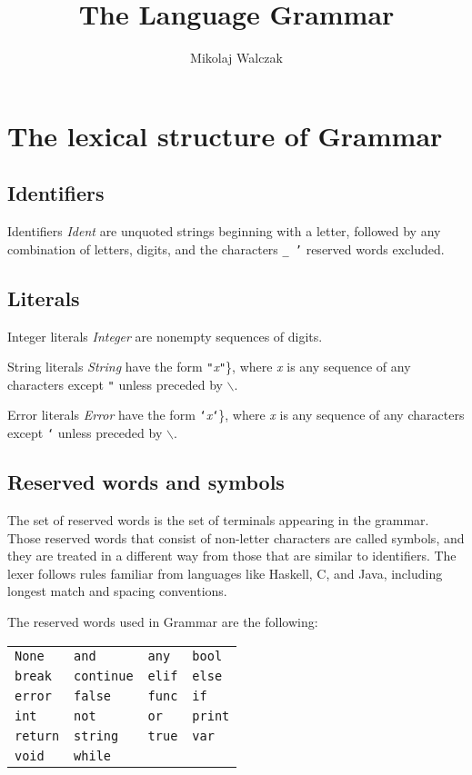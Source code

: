 \documentclass{article}
\title{The Language Grammar}
\author{Mikolaj Walczak}
\begin{document}
\maketitle
\clearpage

\section{The lexical structure of Grammar}

\subsection{Identifiers}

Identifiers \textit{Ident} are unquoted strings beginning with a letter,
followed by any combination of letters, digits, and the characters \texttt{\_ '}
reserved words excluded.

\subsection{Literals}

Integer literals \textit{Integer} are nonempty sequences of digits.

String literals \textit{String} have the form
\texttt{"}\textit{x}\texttt{"}\}, where \textit{x} is any sequence of any characters
except \texttt{"} unless preceded by \texttt{$\backslash$}.

Error literals \textit{Error} have the form
\texttt{`}\textit{x}\texttt{`}\}, where \textit{x} is any sequence of any characters
except \texttt{`} unless preceded by \texttt{$\backslash$}.

\subsection{Reserved words and symbols}

The set of reserved words is the set of terminals appearing in the grammar.
Those reserved words that consist of non-letter characters are called symbols,
and they are treated in a different way from those that are similar to
identifiers. The lexer follows rules familiar from languages like Haskell,
C, and Java, including longest match and spacing conventions.

The reserved words used in Grammar are the following:

\begin{center}\begin{tabular}{llll}
\texttt{None} & \texttt{and} & \texttt{any} & \texttt{bool} \\
\texttt{break} & \texttt{continue} & \texttt{elif} & \texttt{else} \\
\texttt{error} & \texttt{false} & \texttt{func} & \texttt{if} \\
\texttt{int} & \texttt{not} & \texttt{or} & \texttt{print} \\
\texttt{return} & \texttt{string} & \texttt{true} & \texttt{var} \\
\texttt{void} & \texttt{while} &  \\
\end{tabular}\end{center}
\end{document}
